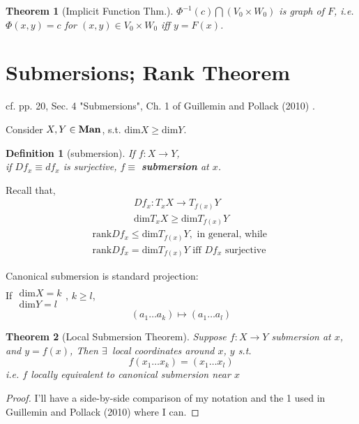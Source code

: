 \documentclass[10pt]{amsart}
\newtheorem{theorem}{Theorem}
\newtheorem{definition}{Definition}
\begin{document}
\begin{multicols*}{2}
\begin{theorem}[Implicit Function Thm.]
  $\Phi^{-1}(c) \bigcap (V_0\times W_0)$ is graph of $F$, i.e. \\
  $\Phi(x,y) =c$ for $(x,y) \in V_0\times W_0$ iff $y=F(x)$.  
  \end{theorem}



\section{Submersions; Rank Theorem} 
cf. pp. 20, Sec. 4 "Submersions", Ch. 1 of Guillemin and Pollack (2010) \cite{VGuilleminAPollack2010}.  

Consider $X,Y\in \text{\textbf{Man}}$, s.t. $\text{dim}X \geq \text{dim}Y$.  

\begin{definition}[submersion] If $f:X\to Y$, \\
if $Df_x \equiv df_x$ is \emph{surjective}, $f\equiv $ \textbf{submersion} at $x$.
\end{definition}
Recall that,  
\[
\begin{gathered}
	Df_x:T_xX \to T_{f(x)}Y \\
	\text{dim}T_xX \geq \text{dim}T_{f(x)}Y
\end{gathered}
\]
\[
\begin{gathered}
\text{rank}Df_x \leq \text{dim}T_{f(x)}Y, \text{ in general, while } \\
\text{rank}Df_x = \text{dim}T_{f(x)}Y \text{ iff } Df_x \text{ surjective }
\end{gathered}
\]

Canonical submersion is standard projection: \\
If $\begin{gathered} \quad \\
\text{dim}X = k \\
\text{dim}Y = l \end{gathered}$, $k\geq l$, 
\[
(a_1 \dots a_k ) \mapsto (a_1 \dots a_l)
\]

\begin{theorem}[Local Submersion Theorem]\label{Thm:LocalSubmersion}
	Suppose $f:X\to Y$ submersion at $x$, and $y = f(x)$, 
	Then $\exists \, $ local coordinates around $x$, $y$ s.t. 
	\[
	f(x_1\dots x_k) = (x_1 \dots x_l)
	\]
	i.e. $f$ locally equivalent to canonical submersion near $x$
\end{theorem}
\begin{proof}
I'll have a side-by-side comparison of my notation and the 1 used in Guillemin and Pollack (2010) \cite{VGuilleminAPollack2010} where I can.	


\end{proof}
\end{multicols*}
\end{document}
